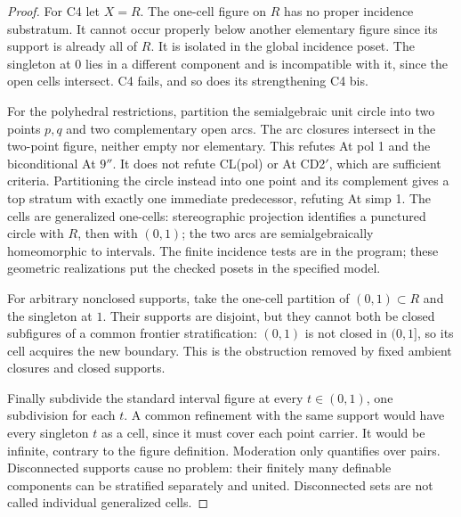\begin{proof}
For C4 let \(X=R\). The one-cell
figure on \(R\) has no proper
incidence substratum. It cannot
occur properly below another
elementary figure since its
support is already all of \(R\).
It is isolated in the global
incidence poset. The singleton
at \(0\) lies in a different
component and is incompatible
with it, since the open cells
intersect. C4 fails, and so
does its strengthening C4 bis.

For the polyhedral restrictions,
partition the semialgebraic unit
circle into two points \(p,q\)
and two complementary open arcs.
The arc closures intersect in
the two-point figure, neither
empty nor elementary. This
refutes At pol 1 and the
biconditional At \(9''\).
It does not refute CL(pol)
or At CD2\( '\), which
are sufficient criteria.
Partitioning
the circle instead into
one point and its complement
gives a top stratum with
exactly one immediate predecessor,
refuting At simp 1.
The cells are generalized
one-cells: stereographic
projection identifies a
punctured circle with \(R\),
then with \((0,1)\); the
two arcs are semialgebraically
homeomorphic to intervals.
The finite incidence tests
are in the program; these
geometric realizations put
the checked posets in the
specified model.

For arbitrary nonclosed supports,
take the one-cell partition
of \((0,1)\subset R\) and the
singleton at \(1\).
Their supports are disjoint,
but they cannot both be
closed subfigures of a
common frontier stratification:
\((0,1)\) is not closed in
\((0,1]\), so its cell
acquires the new boundary.
This is the obstruction
removed by fixed ambient
closures and closed supports.

Finally subdivide the standard
interval figure at every
\(t\in(0,1)\), one subdivision
for each \(t\). A common
refinement with the same
support would have every
singleton \(t\) as a cell,
since it must cover each
point carrier. It would
be infinite, contrary to
the figure definition.
Moderation only quantifies
over pairs. Disconnected
supports cause no problem:
their finitely many definable
components can be stratified
separately and united.
Disconnected sets are
not called individual
generalized cells.
\end{proof}
